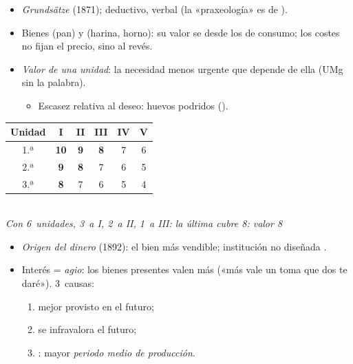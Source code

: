 \documentclass{article}
\begin{document}
\begin{columnas}
\begin{itemize}
\item \emph{Grundsätze} (1871); deductivo, verbal (la «praxeología» es de ).
\item Bienes  (pan) y  (harina, horno): su valor se  desde los de consumo; los costes no fijan el precio, sino al revés.
\item \emph{Valor de una unidad}: la necesidad menos urgente que depende de ella (UMg sin la palabra).
  \begin{itemize}
  \item Escasez relativa al deseo: huevos podridos ().
  \end{itemize}
\end{itemize}
\begin{center}\footnotesize
\begin{tabular}{@{}c*{5}{c}@{}}
\toprule
\textbf{Unidad} & \textbf{I} & \textbf{II} & \textbf{III} & \textbf{IV} & \textbf{V}\\
\midrule
1.ª & \textbf{10} & \textbf{9} & \textbf{8} & 7 & 6\\
2.ª & \textbf{9} & \textbf{8} & 7 & 6 & 5\\
3.ª & \textbf{8} & 7 & 6 & 5 & 4\\
\bottomrule
\end{tabular}\\[1pt]
{\color{tceegris}\scriptsize\itshape Con 6~unidades, 3~a I, 2~a II, 1~a III: la última cubre 8: valor 8}
\end{center}
\begin{itemize}
\item \emph{Origen del dinero} (1892): el bien más vendible; institución no diseñada .
\end{itemize}
\begin{itemize}
\item Interés = \emph{agio}: los bienes presentes valen más («más vale un toma que dos te daré»). 3~causas:
  \begin{enumerate}
  \item mejor provisto en el futuro;
  \item se infravalora el futuro;
  \item {}: mayor \emph{periodo medio de producción}.
  \end{enumerate}

\end{itemize}
\end{columnas}
\end{document}

